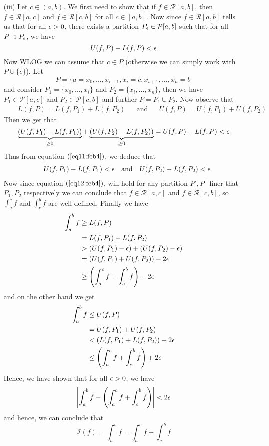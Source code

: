 \begin{prf}
\begin{enumerate}
    \item[(iii)] Let $c \in (a,b)$. We first need to show that if $f \in \mathcal{R}[a,b]$, then $f \in \mathcal{R}[a,c]$ and $f \in \mathcal{R}[c,b]$ for all $c \in [a,b]$. Now since $f \in \mathcal{R}[a,b]$  tells us that for all $\epsilon > 0$, there exists a partition $P_{\epsilon} \in \mathcal{P}[a,b]$ such that for all $P \supset P_{\epsilon}$, we have 
    \[
        U(f,P) - L(f,P) < \epsilon    
    \] 
    Now WLOG we can assume that $c \in P$ (otherwise we can simply work with $P \cup \{c\}$). Let \[P = \{a = x_0, \dots, x_{i-1}, x_i = c, x_{i+1}, \dots, x_n = b\ \] and consider $P_1 = \{x_0,\dots,x_i\}$ and $P_2 = \{x_i,\dots,x_n\}$, then we have $P_1 \in \mathcal{P}[a,c]$ and $P_2 \in \mathcal{P}[c,b]$ and further $P = P_1 \cup P_2 $. Now observe that 
    \begin{align*}
        &&L(f,P) = L(f,P_1) + L(f,P_2) &&\mbox{and} &&U(f,P) = U(f,P_1) + U(f,P_2)
    \end{align*}
    Then we get that 
    \begin{equation}\label{eq11:feb4}
        \underbrace{(U(f,P_1) - L(f,P_1))}_{\geq 0} + \underbrace{(U(f,P_2) - L(f,P_2))}_{\geq 0} = U(f,P) - L(f,P) < \epsilon
    \end{equation}
    Thus from equation $(\ref{eq11:feb4})$, we deduce that 
    \begin{align}\label{eq12:feb4}
        &&U(f,P_1) - L(f,P_1) < \epsilon &&\mbox{and} &&U(f,P_2) - L(f,P_2) < \epsilon
    \end{align}
    Now since equation $(\ref{eq12:feb4})$, will hold for any partition $P', P^{''}$ finer that $P_1, P_2$ respectively we can conclude that $f \in \mathcal{R}[a,c]$ and $f \in \mathcal{R}[c,b]$, so $\int_a^c f $ and $\int_c^b f$ are well defined. Finally we have 
    \begin{align*}
        \int_a^b f &\geq L(f,P) \\ 
                   &= L(f,P_1) + L(f,P_2) \\ 
                   &> (U(f,P_1)-\epsilon) + (U(f,P_2)-\epsilon) \\ 
                   &= (U(f,P_1)+U(f,P_2)) - 2\epsilon \\ 
                   &\geq \left(\int_a^c f + \int_c^b f \right) - 2\epsilon
    \end{align*}
    and on the other hand we get 
    \begin{align*}
        \int_a^b f &\leq U(f,P) \\ 
                   &= U(f,P_1) + U(f,P_2) \\ 
                   &< (L(f,P_1)+L(f,P_2)) + 2\epsilon \\ 
                   &\leq \left( \int_a^c f + \int_c^b f \right) + 2\epsilon
    \end{align*}
    Hence, we have shown that for all $\epsilon > 0$, we have  
    \[
        \left| \int_a^b f - \left( \int_a^c f + \int_c^b f\right) \right| < 2\epsilon
    \]  
    and hence, we can conclude that 
    \[ 
        \mathcal{I}(f) = \int_a^b f = \int_a^c f + \int_c^b f    
    \]
\end{enumerate}
\end{prf}
